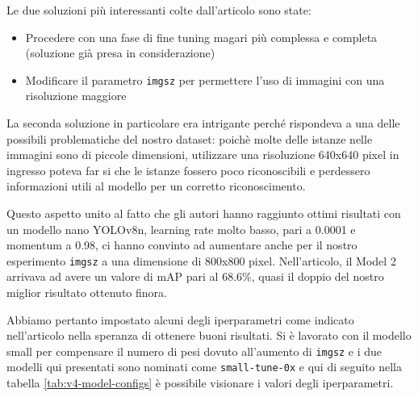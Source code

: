 Le due soluzioni più interessanti colte dall'articolo sono state: 
\begin{itemize}
    \item Procedere con una fase di fine tuning magari più complessa e completa (soluzione già presa in 
    considerazione)
    \item Modificare il parametro \texttt{imgsz} per permettere l'uso di immagini con una risoluzione maggiore
\end{itemize}

La seconda soluzione in particolare era intrigante perché rispondeva a una delle possibili problematiche del nostro
dataset: poichè molte delle istanze nelle immagini sono di piccole dimensioni, utilizzare una risoluzione 640x640
pixel in ingresso poteva far si che le istanze fossero poco riconoscibili e perdessero informazioni utili
al modello per un corretto riconoscimento. 

Questo aspetto unito al fatto che gli autori hanno raggiunto ottimi risultati con un modello nano YOLOv8n,
learning rate molto basso, pari a 0.0001 e momentum a 0.98, ci hanno convinto ad aumentare anche per il nostro
esperimento \texttt{imgsz} a una dimensione di 800x800 pixel. Nell'articolo, il Model 2 arrivava ad avere un valore
di mAP pari al 68.6\%, quasi il doppio del nostro miglior risultato ottenuto finora.

Abbiamo pertanto impostato alcuni degli iperparametri come indicato nell'articolo nella speranza di ottenere 
buoni risultati. Si è lavorato con il modello small per compensare il numero di pesi dovuto all'aumento di \texttt{imgsz}
e i due modelli qui presentati sono nominati come \texttt{small-tune-0x} e qui di seguito nella tabella
\ref{tab:v4-model-configs} è possibile visionare i valori degli iperparametri.

